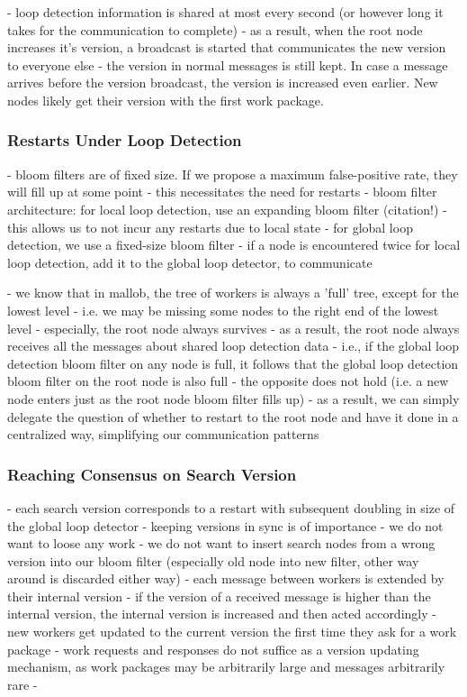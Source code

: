- loop detection information is shared at most every second (or however long it takes for the communication to complete)
- as a result, when the root node increases it's version, a broadcast is started that communicates the new version to everyone else
- the version in normal messages is still kept. In case a message arrives before the version broadcast, the version is increased even earlier. New nodes likely get their version with the first work package.

\subsubsection{Restarts Under Loop Detection}
- bloom filters are of fixed size. If we propose a maximum false-positive rate, they will fill up at some point
- this necessitates the need for restarts
- bloom filter architecture: for local loop detection, use an expanding bloom filter (citation!)
- this allows us to not incur any restarts due to local state
- for global loop detection, we use a fixed-size bloom filter
- if a node is encountered twice for local loop detection, add it to the global loop detector, to communicate

- we know that in mallob, the tree of workers is always a 'full' tree, except for the lowest level
- i.e. we may be missing some nodes to the right end of the lowest level
- especially, the root node always survives
- as a result, the root node always receives all the messages about shared loop detection data
- i.e., if the global loop detection bloom filter on any node is full, it follows that the global loop detection bloom filter on the root node is also full
- the opposite does not hold (i.e. a new node enters just as the root node bloom filter fills up)
- as a result, we can simply delegate the question of whether to restart to the root node and have it done in a centralized way, simplifying our communication patterns

\subsubsection{Reaching Consensus on Search Version}
- each search version corresponds to a restart with subsequent doubling in size of the global loop detector
- keeping versions in sync is of importance
- we do not want to loose any work
- we do not want to insert search nodes from a wrong version into our bloom filter (especially old node into new filter, other way around is discarded either way)
- each message between workers is extended by their internal version
- if the version of a received message is higher than the internal version, the internal version is increased and then acted accordingly
- new workers get updated to the current version the first time they ask for a work package
- work requests and responses do not suffice as a version updating mechanism, as work packages may be arbitrarily large and messages arbitrarily rare
- 


